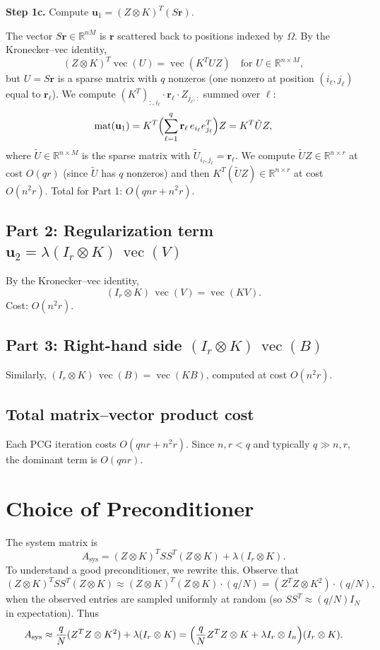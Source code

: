 \documentclass[11pt]{article}
\theoremstyle{definition}
\DeclareMathOperator{\vecop}{vec}
\newcommand{\R}{\mathbb{R}}
\begin{document}
\textbf{Step 1c.} Compute $\mathbf{u}_1 = (Z \otimes K)^T (S\mathbf{r})$.

The vector $S\mathbf{r} \in \R^{nM}$ is $\mathbf{r}$ scattered back to positions indexed by $\Omega$. By the Kronecker--vec identity,
\[
  (Z \otimes K)^T \vecop(U) = \vecop(K^T U Z)
  \quad \text{for } U \in \R^{n \times M},
\]
but $U = S\mathbf{r}$ is a sparse matrix with $q$ nonzeros (one nonzero at position $(i_\ell, j_\ell)$ equal to $\mathbf{r}_\ell$). We compute $(K^T)_{:, i_\ell} \cdot \mathbf{r}_\ell \cdot Z_{j_\ell,:}$ summed over $\ell$:
\[
  \mathrm{mat}(\mathbf{u}_1) = K^T \Bigl(\sum_{\ell=1}^q \mathbf{r}_\ell\, e_{i_\ell} e_{j_\ell}^T\Bigr) Z
  = K^T \tilde{U} Z,
\]
where $\tilde{U} \in \R^{n \times M}$ is the sparse matrix with $\tilde{U}_{i_\ell, j_\ell} = \mathbf{r}_\ell$. We compute $\tilde{U} Z \in \R^{n \times r}$ at cost $O(qr)$ (since $\tilde{U}$ has $q$ nonzeros) and then $K^T (\tilde{U}Z) \in \R^{n \times r}$ at cost $O(n^2 r)$. Total for Part 1: $O(qnr + n^2 r)$.

\subsection{Part 2: Regularization term $\mathbf{u}_2 = \lambda(I_r \otimes K)\,\vecop(V)$}

By the Kronecker--vec identity,
\[
  (I_r \otimes K)\,\vecop(V) = \vecop(KV).
\]
Cost: $O(n^2 r)$.

\subsection{Part 3: Right-hand side $(I_r \otimes K)\,\vecop(B)$}

Similarly, $(I_r \otimes K)\,\vecop(B) = \vecop(KB)$, computed at cost $O(n^2 r)$.

\subsection{Total matrix--vector product cost}

Each PCG iteration costs $O(qnr + n^2 r)$. Since $n, r < q$ and typically $q \gg n, r$, the dominant term is $O(qnr)$.

\section{Choice of Preconditioner}

The system matrix is
\[
  A_{\mathrm{sys}} = (Z \otimes K)^T SS^T (Z \otimes K) + \lambda (I_r \otimes K).
\]
To understand a good preconditioner, we rewrite this. Observe that
\[
  (Z \otimes K)^T SS^T (Z \otimes K) \approx (Z \otimes K)^T (Z \otimes K) \cdot (q/N)
  = (Z^T Z \otimes K^2) \cdot (q/N),
\]
when the observed entries are sampled uniformly at random (so $SS^T \approx (q/N) I_N$ in expectation). Thus
\[
  A_{\mathrm{sys}} \approx \frac{q}{N}(Z^T Z \otimes K^2) + \lambda (I_r \otimes K)
  = \Bigl(\frac{q}{N} Z^T Z \otimes K + \lambda I_r \otimes I_n\Bigr)(I_r \otimes K).
\]
\end{document}

